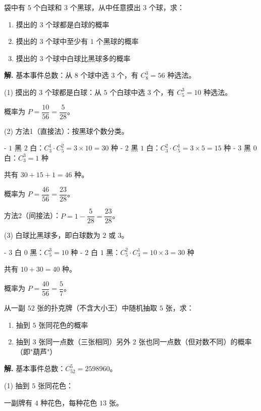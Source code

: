 \documentclass[11pt]{ctexrep}
\begin{document}
\begin{realexam}[2025 上海高三一模]
    袋中有 $5$ 个白球和 $3$ 个黑球，从中任意摸出 $3$ 个球，求：
    \begin{enumerate}
        \item 摸出的 $3$ 个球都是白球的概率
        \item 摸出的 $3$ 个球中至少有 $1$ 个黑球的概率
        \item 摸出的 $3$ 个球中白球比黑球多的概率
    \end{enumerate}
\end{realexam}

\textbf{解.} 基本事件总数：从 $8$ 个球中选 $3$ 个，有 $C_8^3 = 56$ 种选法。

(1) 摸出的 $3$ 个球都是白球：从 $5$ 个白球中选 $3$ 个，有 $C_5^3 = 10$ 种选法。

概率为 $P = \dfrac{10}{56} = \dfrac{5}{28}$。

(2) 方法1（直接法）：按黑球个数分类。

- $1$ 黑 $2$ 白：$C_3^1 \cdot C_5^2 = 3 \times 10 = 30$ 种
- $2$ 黑 $1$ 白：$C_3^2 \cdot C_5^1 = 3 \times 5 = 15$ 种
- $3$ 黑 $0$ 白：$C_3^3 = 1$ 种

共有 $30 + 15 + 1 = 46$ 种。

概率为 $P = \dfrac{46}{56} = \dfrac{23}{28}$。

方法2（间接法）：$P = 1 - \dfrac{5}{28} = \dfrac{23}{28}$。

(3) 白球比黑球多，即白球数为 $2$ 或 $3$。

- $3$ 白 $0$ 黑：$C_5^3 = 10$ 种
- $2$ 白 $1$ 黑：$C_5^2 \cdot C_3^1 = 10 \times 3 = 30$ 种

共有 $10 + 30 = 40$ 种。

概率为 $P = \dfrac{40}{56} = \dfrac{5}{7}$。

\begin{realexam}[练习]
    从一副 $52$ 张的扑克牌（不含大小王）中随机抽取 $5$ 张，求：
    \begin{enumerate}
        \item 抽到 $5$ 张同花色的概率
        \item 抽到 $3$ 张同一点数（三张相同）另外 $2$ 张也同一点数（但对数不同）的概率（即"葫芦"）
    \end{enumerate}
\end{realexam}

\textbf{解.} 基本事件总数：$C_{52}^5 = 2598960$。

(1) 抽到 $5$ 张同花色：

一副牌有 $4$ 种花色，每种花色 $13$ 张。
\end{document}
